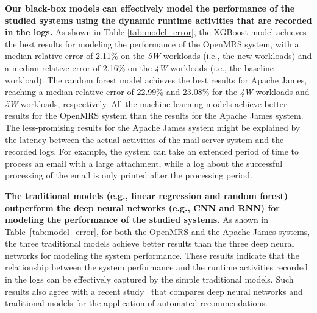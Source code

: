 \noindent\textbf{Our black-box models can effectively model the performance of the studied systems using the dynamic runtime activities that are recorded in the logs.} 
As shown in Table \ref{tab:model_error}, the XGBoost model achieves the best results for modeling the performance of the OpenMRS system, with a median relative error of 2.11\% on the \emph{5W} workloads (i.e., the new workloads) and a median relative error of 2.16\% on the \emph{4W} workloads (i.e., the baseline workload). 
The random forest model achieves the best results for Apache James, reaching a median relative error of 22.99\% and 23.08\% for the \emph{4W} workloads and \emph{5W} workloads, respectively. 
All the machine learning models achieve better results for the OpenMRS system than the results for the Apache James system.
The less-promising results for the Apache James system might be explained by the latency between the actual activities of the mail server system and the recorded logs. For example, the system can take an extended period of time to process an email with a large attachment, while a log about the successful processing of the email is only printed after the processing period.

\noindent\textbf{The traditional models (e.g., linear regression and random forest) outperform the deep neural networks (e.g., CNN and RNN) for modeling the performance of the studied systems.}
As shown in Table~\ref{tab:model_error}, for both the OpenMRS and the Apache James systems, the three traditional models achieve better results than the three deep neural networks for modeling the system performance.
These results indicate that the relationship between the system performance and the runtime activities recorded in the logs can be effectively captured by the simple traditional models.
Such results also agree with a recent study~\citep{DacremaArxiv2019} that compares deep neural networks and traditional models for the application of automated recommendations.


